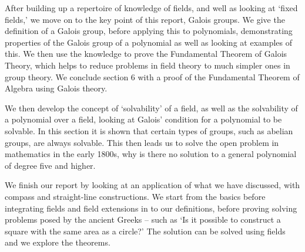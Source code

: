 After building up a repertoire of knowledge of fields, and well as looking at ‘fixed fields,’ we move on to the key point of this report, Galois groups. We give the definition of a Galois group, before applying this to polynomials, demonstrating properties of the Galois group of a polynomial as well as looking at examples of this. We then use the knowledge to prove the Fundamental Theorem of Galois Theory, which helps to reduce problems in field theory to much simpler ones in group theory. We conclude section 6 with a proof of the Fundamental Theorem of Algebra using Galois theory.

We then develop the concept of ‘solvability’ of a field, as well as the solvability of a polynomial over a field, looking at Galois’ condition for a polynomial to be solvable. In this section it is shown that certain types of groups, such as abelian groups, are always solvable. This then leads us to solve the open problem in mathematics in the early 1800s, why is there no solution to a general polynomial of degree five and higher.

We finish our report by looking at an application of what we have discussed, with compass and straight-line constructions. We start from the basics before integrating fields and field extensions in to our definitions, before proving solving problems posed by the ancient Greeks – such as ‘Is it possible to construct a square with the same area as a circle?’ The solution can be solved using fields and we explore the theorems.
